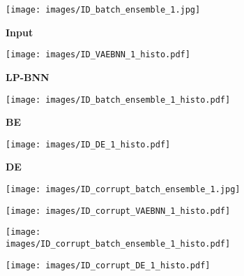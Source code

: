\documentclass[10pt,twocolumn,letterpaper]{article}
\begin{document}
\begin{figure}[t!]
\renewcommand{\figurename}{Figure}
\renewcommand{\captionfont}{\small}
     \centering
        \begin{subfigure}[b]{0.16\linewidth}
        \caption*{{\textbf{Input}}}
        \texttt{[image: images/ID\_batch\_ensemble\_1.jpg]}
\end{subfigure}\;
        \begin{subfigure}[b]{0.22\linewidth}
        \caption*{{\textbf{LP-BNN}}}
        \texttt{[image: images/ID\_VAEBNN\_1\_histo.pdf]}
\end{subfigure}\;
        \begin{subfigure}[b]{0.22\linewidth}
        \caption*{{\textbf{BE}}}
        \texttt{[image: images/ID\_batch\_ensemble\_1\_histo.pdf]}
\end{subfigure}\;
         \begin{subfigure}[b]{0.22\linewidth}
        \caption*{{\textbf{DE }}}
        \texttt{[image: images/ID\_DE\_1\_histo.pdf]}
\end{subfigure}\;


        \begin{subfigure}[b]{0.16\linewidth}
\texttt{[image: images/ID\_corrupt\_batch\_ensemble\_1.jpg]}
\end{subfigure}\;
        \begin{subfigure}[b]{0.22\linewidth}
\texttt{[image: images/ID\_corrupt\_VAEBNN\_1\_histo.pdf]}
\end{subfigure}\;
        \begin{subfigure}[b]{0.22\linewidth}
\texttt{[image: images/ID\_corrupt\_batch\_ensemble\_1\_histo.pdf]}
\end{subfigure}\;
         \begin{subfigure}[b]{0.22\linewidth}
\texttt{[image: images/ID\_corrupt\_DE\_1\_histo.pdf]}
\end{subfigure}\;


\end{figure}
\end{document}
